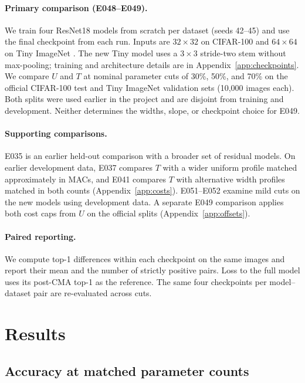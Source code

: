 \documentclass[11pt,a4paper]{article}
\begin{document}
\paragraph{Primary comparison (E048--E049).}
We train four ResNet18 \citep{he2016resnet} models from scratch per
dataset (seeds 42--45) and use the final checkpoint from each run. Inputs
are $32\times32$ on CIFAR-100 \citep{krizhevsky2009cifar} and
$64\times64$ on Tiny ImageNet \citep{stanfordTinyImageNet}. The new Tiny
model uses a $3\times3$ stride-two stem without max-pooling; training
and architecture details are in Appendix~\ref{app:checkpoints}.
We compare $U$ and $T$ at nominal parameter cuts of 30\%, 50\%, and
70\% on the official CIFAR-100 test and Tiny ImageNet validation sets
(10,000 images each). Both splits were used earlier in the project and
are disjoint from training and development. Neither determines the
widths, slope, or checkpoint choice for E049.

\paragraph{Supporting comparisons.}
E035 is an earlier held-out comparison with a broader set of residual
models. On earlier development data, E037 compares $T$ with a wider
uniform profile matched approximately in MACs, and E041 compares $T$
with alternative width profiles matched in both counts
(Appendix~\ref{app:costs}). E051--E052 examine mild cuts on the new
models using development data. A separate E049 comparison applies both
cost caps from $U$ on the official splits (Appendix~\ref{app:offsets}).

\paragraph{Paired reporting.}
We compute top-1 differences within each checkpoint on the same images
and report their mean and the number of strictly positive pairs. Loss to
the full model uses its post-CMA top-1 as the reference. The same four
checkpoints per model--dataset pair are re-evaluated across cuts.

\section{Results}
\label{sec:results}

\subsection{Accuracy at matched parameter counts}
\label{sec:matched-new}
\end{document}

